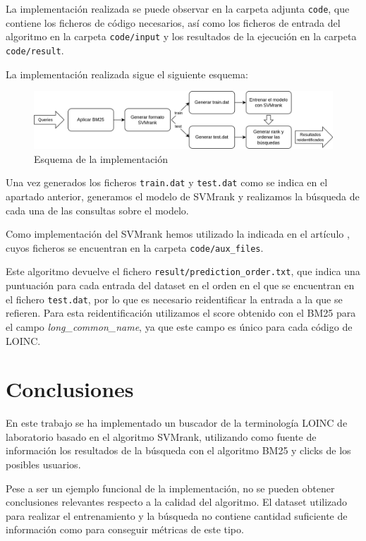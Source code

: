\documentclass[a4paper,12pt]{article}
\begin{document}
	La implementación realizada se puede observar en la carpeta adjunta \texttt{code}, que contiene los ficheros de código necesarios, así como los ficheros de entrada del algoritmo en la carpeta \texttt{code/input} y los resultados de la ejecución en la carpeta \texttt{code/result}.
	
	La implementación realizada sigue el siguiente esquema:
	
	\begin{figure}[H]
		\centering
		\includegraphics[width=\textwidth]{include/esquema_implementacion.png}
		\caption{Esquema de la implementación}
	\end{figure}
	
	Una vez generados los ficheros \texttt{train.dat} y \texttt{test.dat} como se indica en el apartado anterior, generamos el modelo de SVMrank y realizamos la búsqueda de cada una de las consultas sobre el modelo. 
	
	Como implementación del SVMrank hemos utilizado la indicada en el artículo \cite{articulo-clase}, cuyos ficheros se encuentran en la carpeta \texttt{code/aux\_files}.
	
	Este algoritmo devuelve el fichero \texttt{result/prediction\_order.txt}, que indica una puntuación para cada entrada del dataset en el orden en el que se encuentran en el fichero \texttt{test.dat}, por lo que es necesario reidentificar la entrada a la que se refieren. Para esta reidentificación utilizamos el score obtenido con el BM25 para el campo \textit{long\_common\_name}, ya que este campo es único para cada código de LOINC.
	
	\section{Conclusiones}
	
	En este trabajo se ha implementado un buscador de la terminología LOINC de laboratorio basado en el algoritmo SVMrank, utilizando como fuente de información los resultados de la búsqueda con el algoritmo BM25 y clicks de los posibles usuarios. 
	
	Pese a ser un ejemplo funcional de la implementación, no se pueden obtener conclusiones relevantes respecto a la calidad del algoritmo. El dataset utilizado para realizar el entrenamiento y la búsqueda no contiene cantidad suficiente de información como para conseguir métricas de este tipo.
	
\end{document}
